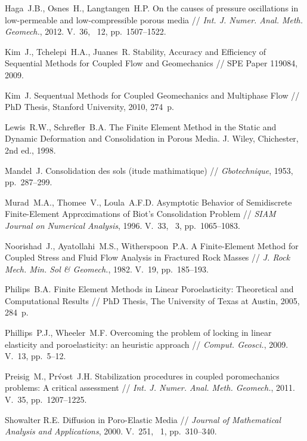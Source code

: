 \begin{thebibliography}{1000}
Haga~J.B., Osnes~H., Langtangen~H.P.
On the causes of pressure oscillations in low-permeable and low-compressible porous media //
\emph{Int. J. Numer. Anal. Meth. Geomech.}, 2012.
V.~36, \No~12, pp.~1507--1522.

Kim~J., Tchelepi~H.A., Juanes~R. Stability, Accuracy and Efficiency of Sequential Methods
for Coupled Flow and Geomechanics // SPE Paper 119084, 2009. 

Kim~J. Sequentual Methods for Coupled Geomechanics and Multiphase Flow //
PhD Thesis, Stanford University, 2010, 274~p.

Lewis~R.W., Schrefler~B.A. The Finite Element
Method in the Static and Dynamic Deformation and Consolidation in
Porous Media. J. Wiley, Chichester, 2nd ed., 1998.

Mandel~J. Consolidation des sols (itude mathimatique) // \emph{Gbotechnique}, 1953, pp.~287--299.

Murad~M.A., Thomee~V., Loula~A.F.D.
Asymptotic Behavior of Semidiscrete Finite-Element Approximations of Biot's Consolidation
Problem // \emph{SIAM Journal on Numerical Analysis}, 1996.
V.~33, \No~3, pp.~1065--1083.

Noorishad~J., Ayatollahi~M.S., Witherspoon~P.A.
A Finite-Element Method for Coupled
Stress and Fluid Flow Analysis in
Fractured Rock Masses // \emph{J. Rock Mech. Min. Sol \& Geomech.}, 1982.
V.~19, pp.~185--193.

Philips~B.A.
Finite Element Methods in Linear Poroelasticity:
Theoretical and Computational Results // PhD Thesis, The University of Texas at Austin, 2005, 284~p.

Phillips~P.J., Wheeler~M.F.
Overcoming the problem of locking in linear elasticity
and poroelasticity: an heuristic approach // \emph{Comput. Geosci.}, 2009.
V.~13, pp.~5--12.

Preisig~M., Pr\'vost~J.H.
Stabilization procedures in coupled poromechanics problems:
A critical assessment // \emph{Int. J. Numer. Anal. Meth. Geomech.}, 2011.
V.~35, pp.~1207--1225.

Showalter R.E.
Diffusion in Poro-Elastic Media // \emph{Journal of Mathematical Analysis and Applications}, 2000.
V.~251, \No~1, pp.~310--340.


\end{thebibliography}
